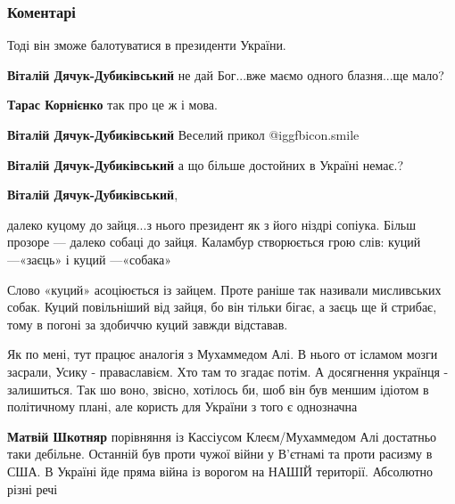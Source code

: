  
 
 
 
 
\subsubsection{Коментарі}

\begin{itemize} %
Тоді він зможе балотуватися в президенти України.

\begin{itemize} %
\textbf{Віталій Дячук-Дубиківський} не дай Бог...вже маємо одного блазня...ще мало?

\textbf{Тарас Корнієнко} так про це ж і мова.

\textbf{Віталій Дячук-Дубиківський} Веселий прикол  @igg{fbicon.smile} 

\textbf{Віталій Дячук-Дубиківський} а що більше достойних в Україні немає.?

\textbf{Віталій Дячук-Дубиківський}, 

далеко куцому до зайця...з нього президент як з його ніздрі сопіука. Більш
прозоре — далеко собаці до зайця. Каламбур створюється грою слів: куций
—«заєць» і куций —«собака»

Слово «куций» асоціюється із зайцем. Проте раніше так називали мисливських
собак. Куций повільніший від зайця, бо він тільки бігає, а заєць ще й стрибає,
тому в погоні за здобиччю куций завжди відставав.

\end{itemize} %


Як по мені, тут працює аналогія з Мухаммедом Алі.
В нього от ісламом мозги засрали, Усику - праваславієм.
Хто там то згадає потім. А досягнення українця - залишиться.
Так шо воно, звісно, хотілось би, шоб він був меншим ідіотом в політичному плані, але користь для України з того є однозначна

\begin{itemize} %
\textbf{Матвій Шкотняр} порівняння із Кассіусом Клеєм/Мухаммедом Алі достатньо таки дебільне. Останній був проти чужої війни у В'єтнамі та проти расизму в США. В Україні йде пряма війна із ворогом на НАШІЙ території. Абсолютно різні речі


\end{itemize}
\end{itemize}
